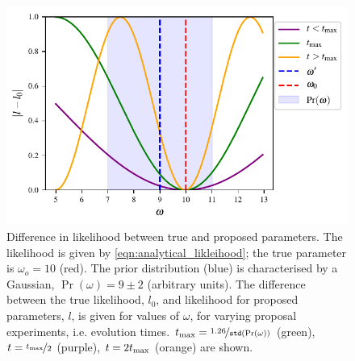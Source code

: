 \begin{figure}[t]
    \begin{center}
        \includegraphics{theoretical_study/figures/likelihood_v_prior.pdf}
    \end{center}
    \caption[Difference in likelihood between true and proposed parameters]{
        Difference in \gls{likelihood} between true and proposed parameters. 
        The likelihood is given by \cref{eqn:analytical_likleihood}; 
            the true parameter is $\omega_o=10$ (red).
        The prior distribution (blue) is characterised by a Gaussian,
        $\Pr(\omega) = 9 \pm 2$ (arbitrary units).
        The difference between the true likelihood, $l_0$, and likelihood for proposed parameters, $l$, 
            is given for values of $\omega$, for varying proposal experiments, i.e. evolution times. 
        $t_{\rm{max}} = \nicefrac{1.26}{\texttt{std}(\Pr(\omega))}$ (green), 
        $t = \nicefrac{t_{\rm{max}}}{2}$ (purple), 
        $t = 2t_{\rm{max}}$ (orange) are shown.
    }
    \label{fig:likelihood_v_prior}
\end{figure}



